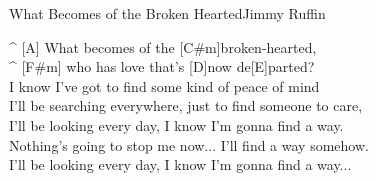 \begin{song}{What Becomes of the Broken Hearted}{Jimmy Ruffin}
\begin{guitar}
^ [A] What becomes of the [C#m]broken-hearted,\\
^ [F#m] who has love that's [D]now de[E]parted?\\
I know I've got to find some kind of peace of mind \\
I'll be searching everywhere, just to find someone to care, \\
I'll be looking every day, I know I'm gonna find a way. \\
Nothing's going to stop me now... I'll find a way somehow. \\
I'll be looking every day, I know I'm gonna find a way...\\
\end{guitar}

\end{song}
